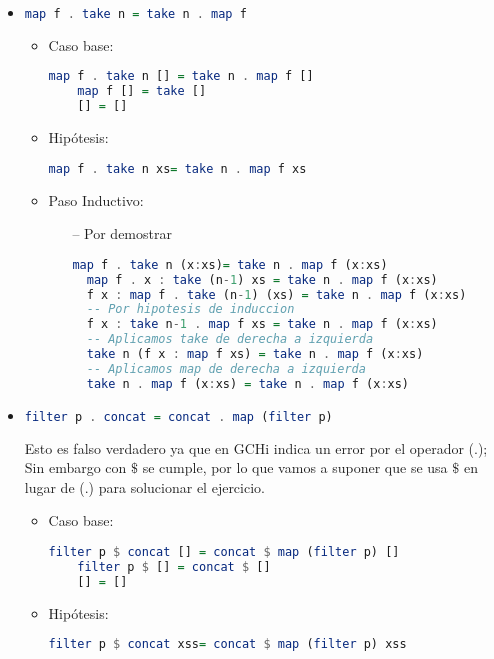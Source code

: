 \documentclass[spanish,12pt,letterpaper]{article}
\begin{document}
\begin{itemize}
\item
  \begin{lstlisting}[language=Haskell]
    map f . take n = take n . map f\end{lstlisting}
  \begin{itemize}
  \item Caso base:
\begin{lstlisting}[language=Haskell]
    map f . take n [] = take n . map f []
    map f [] = take []
    [] = []\end{lstlisting}
  \item Hipótesis:
  \begin{lstlisting}[language=Haskell]
    map f . take n xs= take n . map f xs\end{lstlisting}
  \item Paso Inductivo:
  	\begin{itemize}
  	\item[--] Por demostrar
\begin{lstlisting}[language=Haskell]
  map f . take n (x:xs)= take n . map f (x:xs)
  map f . x : take (n-1) xs = take n . map f (x:xs)
  f x : map f . take (n-1) (xs) = take n . map f (x:xs)
  -- Por hipotesis de induccion
  f x : take n-1 . map f xs = take n . map f (x:xs)
  -- Aplicamos take de derecha a izquierda
  take n (f x : map f xs) = take n . map f (x:xs)
  -- Aplicamos map de derecha a izquierda
  take n . map f (x:xs) = take n . map f (x:xs)\end{lstlisting}
\end{itemize}
  \end{itemize}
\item
  \begin{lstlisting}[language=Haskell]
    filter p . concat = concat . map (filter p)\end{lstlisting}
    Esto es falso verdadero ya que en GCHi indica un error por el
    operador (.); Sin embargo con $\$$ se cumple, por lo que vamos
    a suponer que se usa $\$$ en lugar de (.) para solucionar el
    ejercicio.
\begin{itemize}
  \item Caso base:
	\begin{lstlisting}[language=Haskell]
    filter p $ concat [] = concat $ map (filter p) []
    filter p $ [] = concat $ []
    [] = []\end{lstlisting}
  \item Hipótesis:
  \begin{lstlisting}[language=Haskell]
  filter p $ concat xss= concat $ map (filter p) xss\end{lstlisting}

\end{itemize}
\end{itemize}
\end{document}
